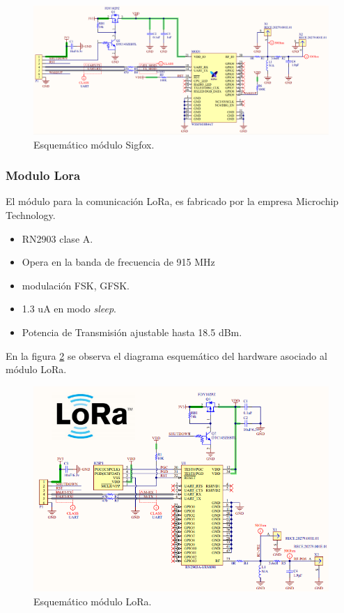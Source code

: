 \begin{figure}[h]
	\centering
	\includegraphics[scale=.45]{./Figures/SIGFOX_SCH.PNG}
	\caption{Esquemático módulo Sigfox.}
	\label{fig:SIGFOX_SCH}
\end{figure}

\subsubsection{Modulo Lora}
El módulo para la comunicación LoRa, es fabricado por la empresa  Microchip Technology.
\begin{itemize}
    \item  RN2903 \protect\footnotemark  clase A.
    \item Opera en la banda de frecuencia de 915 MHz
    \item modulación FSK, GFSK.
    \item 1.3 uA en modo \textit{sleep}.
    \item Potencia de Transmisión ajustable hasta 18.5 dBm.
\end{itemize}

En la figura \ref{fig:lORA_SCH} se observa el diagrama esquemático del hardware asociado al módulo LoRa.

\begin{figure}[h]
	\centering
	\includegraphics[scale=.55]{./Figures/lORA_SCH.PNG}
	\caption{Esquemático módulo LoRa.}
	\label{fig:lORA_SCH}
\end{figure}

